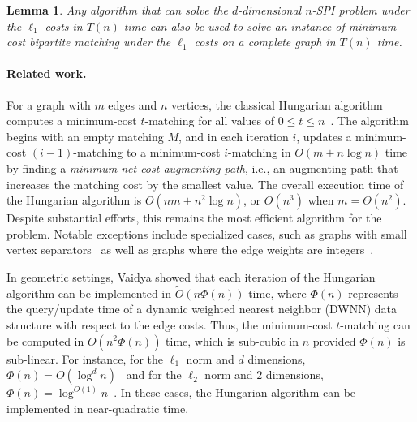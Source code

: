 \documentclass[11pt,onecolumn]{article}
\newtheorem{lemma}{Lemma}[section]
\newcommand\myparagraph[1]{\paragraph{#1}}
\begin{document}
\begin{lemma}\label{lemma:kSPI_reduction}
Any algorithm that can solve the $d$-dimensional $n$-SPI problem under the $\ell_1$ costs in $T(n)$ time can also be used to solve an instance of minimum-cost bipartite matching under the $\ell_1$ costs on a complete graph in $T(n)$ time.
\end{lemma} 


%








\myparagraph{Related work.}
For a graph with $m$ edges and $n$ vertices, the classical Hungarian algorithm computes a minimum-cost $t$-matching for all values of $0\le t\le n$~\cite{kuhn1955hungarian, phatak2022computing}. The algorithm begins with an empty matching $M$, and in each iteration $i$, updates a minimum-cost $(i-1)$-matching to a minimum-cost $i$-matching in $O(m+n\log n)$ time by finding a \emph{minimum net-cost augmenting path}, i.e., an augmenting path that increases the matching cost by the smallest value. The overall execution time of the Hungarian algorithm is $O(nm+n^2\log n)$, or $O(n^3)$ when $m = \Theta(n^2)$.  
Despite substantial efforts, this remains the most efficient algorithm for the problem. Notable exceptions include specialized cases, such as graphs with small vertex separators~\cite{lipton1980applications} as well as graphs where the edge weights are integers~\cite{chen2022maximum,gt_sjc89,gt_jacm91}. 
%


In geometric settings, Vaidya showed that each iteration of the Hungarian algorithm can be implemented in $\tilde{O}(n\Phi(n))$ time, where $\Phi(n)$ represents the query/update time of a dynamic weighted nearest neighbor (DWNN) data structure with respect to the edge costs. Thus, the minimum-cost $t$-matching can be computed in $O(n^2 \Phi(n))$ time, which is sub-cubic in $n$ provided $\Phi(n)$ is sub-linear.  For instance, for the $\ell_1$ norm and $d$ dimensions, $\Phi(n)=O(\log^d n)$~\cite{vaidya1989geometry} and for the $\ell_2$ norm and $2$ dimensions, $\Phi(n)=\log^{O(1)}n$~\cite{kaplan2020dynamic}. In these cases, the Hungarian algorithm can be implemented in near-quadratic time.  
\end{document}

